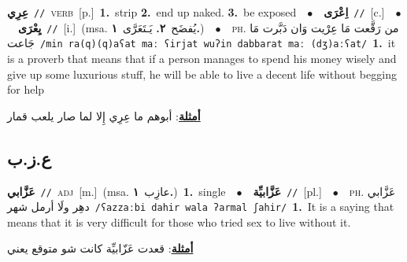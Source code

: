 \documentclass[10pt,a4paper,twoside]{article} %
\begin{document}
\begin{multicols}{2}
{\setlength\topsep{0pt}\textbf{\foreignlanguage{arabic}{عِرِي}}\ {\color{gray}\texttt{//}\color{black}}\ \textsc{verb}\ [p.]\ \textbf{1.}~strip  \textbf{2.}~end up naked.  \textbf{3.}~be exposed\ \ $\bullet$\ \ \setlength\topsep{0pt}\textbf{\foreignlanguage{arabic}{اِعْرَى}}\ {\color{gray}\texttt{//}\color{black}}\ [c.]\ \ $\bullet$\ \ \setlength\topsep{0pt}\textbf{\foreignlanguage{arabic}{يِعْرَى}}\ {\color{gray}\texttt{//}\color{black}}\ [i.]\ \color{gray}(msa. \foreignlanguage{arabic}{يُفضَح}~\foreignlanguage{arabic}{\textbf{٢.}}  \foreignlanguage{arabic}{يَـتَعَرَّى}~\foreignlanguage{arabic}{\textbf{١.}})\color{black}\ \ $\bullet$\ \ \textsc{ph.} \color{gray} \foreignlanguage{arabic}{من رَقَّعت مَا عِرْيت وَان دَبَّرت مَا جَاعت}\color{black}\ {\color{gray}\texttt{/{\sffamily min ra(q)(q)aʕat maː ʕirjat wuʔin dabbarat maː (dʒ)aːʕat}/}\color{black}}\ \textbf{1.}~it is a proverb that means that if a person manages to spend his money wisely and give up some luxurious stuff, he will be able to live a decent life without begging for help\  \begin{flushright}\color{gray}\foreignlanguage{arabic}{\textbf{\underline{\foreignlanguage{arabic}{أمثلة}}}: أبوهم ما عِرِي إِلا لما صار يلعب قمار}\end{flushright}\color{black}} \vspace{2mm}

\vspace{-3mm}
\subsection*{\color{blue}\foreignlanguage{arabic}{ع.ز.ب}\color{blue}{}} 

{\setlength\topsep{0pt}\textbf{\foreignlanguage{arabic}{عَزَّابي}}\ {\color{gray}\texttt{//}\color{black}}\ \textsc{adj}\ [m.]\ \color{gray}(msa. \foreignlanguage{arabic}{عازِب}~\foreignlanguage{arabic}{\textbf{١.}})\color{black}\ \textbf{1.}~single\ \ $\bullet$\ \ \setlength\topsep{0pt}\textbf{\foreignlanguage{arabic}{عَزَّابيِّة}}\ {\color{gray}\texttt{//}\color{black}}\ [pl.]\ \ $\bullet$\ \ \textsc{ph.} \color{gray} \foreignlanguage{arabic}{عَزَّابي دهِر ولَا أرمل شهر}\color{black}\ {\color{gray}\texttt{/{\sffamily ʕazzaːbi dahir wala ʔarmal ʃahir}/}\color{black}}\ \textbf{1.}~It is a saying that means that it is very difficult for those who tried sex to live without it.\  \begin{flushright}\color{gray}\foreignlanguage{arabic}{\textbf{\underline{\foreignlanguage{arabic}{أمثلة}}}: قعدت عَزّابيِّة كانت شو متوقع يعني}\end{flushright}\color{black}} \vspace{2mm}


\end{multicols}
\end{document}
